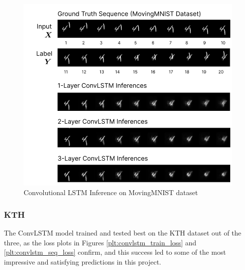 \documentclass{scrartcl}
\begin{document}
\begin{figure}[H]
	\begin{center}
		\includegraphics[width=1\textwidth]{inferences/mmnist/mmnist_inferences_2.png}
	\end{center}
	\caption{Convolutional LSTM Inference on MovingMNIST dataset}
	\label{inf:lstm_mmnist_inference_2}
\end{figure}

\subsubsection{KTH}
\label{subsubsec:kth}

The ConvLSTM model trained and tested best on the KTH dataset out of the three,
as the loss plots in Figures \ref{plt:convlstm_train_loss} and
\ref{plt:convlstm_seq_loss} confirm, and this success led to some of the most
impressive and satisfying predictions in this project.
\end{document}
